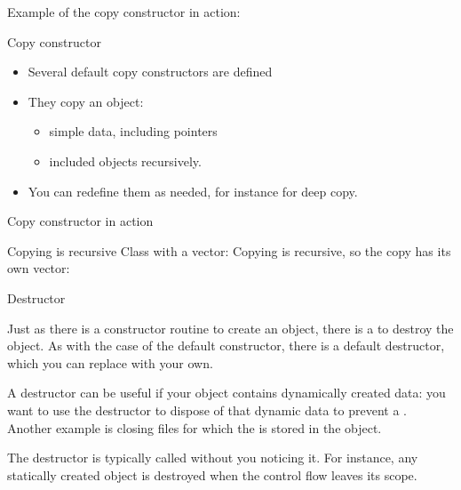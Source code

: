 Example of the copy constructor in action:
%

\begin{slide}{Copy constructor}
  \label{sl:class-copy}
  \begin{multicols}{2}
    \begin{itemize}
    \item
      Several default copy constructors are defined
    \item They copy an object:
      \begin{itemize}
      \item simple data, including pointers
      \item included objects recursively.
      \end{itemize}
    \item You can redefine them as needed, for instance for deep copy.
    \end{itemize}
    \vfill\columnbreak
  \end{multicols}
\end{slide}

\begin{slide}{Copy constructor in action}
  \label{sl:class-copy-out}
\end{slide}

\begin{block}{Copying is recursive}
  \label{sl:class-copy-vector}
  Class with a vector:
  Copying is recursive, so the copy has its own vector:
\end{block}

 {Destructor}
\label{sec:destructor}

Just as there is a constructor routine to create an object, there is a
 to destroy the object.
As with the case of the default constructor, there is a default
destructor, which you can replace with your own.

A destructor can be useful if your object contains dynamically created
data: you want to use the destructor to dispose of that dynamic data
to prevent a . Another example is closing
files for which the  is stored in the object.

The destructor is typically called without you noticing it. For
instance, any statically created object is destroyed when the control
flow leaves its scope.

